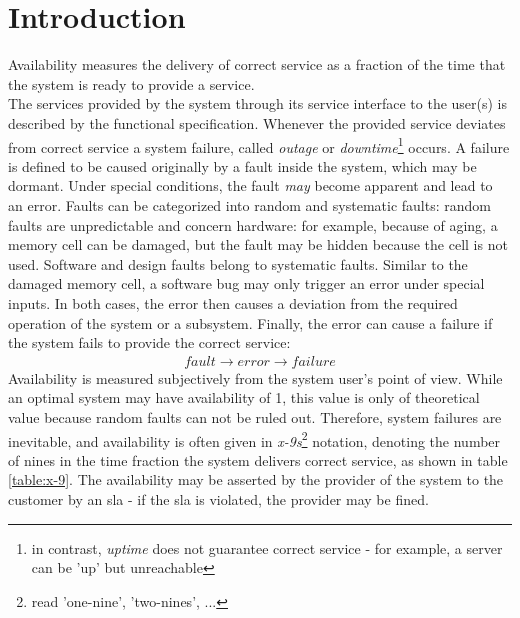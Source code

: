 \section{Introduction}\label{sec:availability}

Availability measures the delivery of correct service as a fraction of the time that the system is ready to provide a service. 
\\
The services provided by the system through its service interface to the user(s) 
is described by the functional specification. Whenever the provided service
deviates from correct service a system failure, called \textit{outage} or \textit{downtime}\footnote{in contrast, \textit{uptime} does not guarantee correct
service - for example, a server can be 'up' but unreachable} occurs. A failure is defined to be caused originally by a fault inside the system, which may be 
dormant. Under special conditions, the fault \textit{may} become apparent and lead to an error. Faults can be categorized into random and systematic faults:
random faults are unpredictable and concern hardware: for example, because of aging, a memory cell can be damaged, but the fault may be hidden because the cell
is not used. Software and design faults belong to systematic faults. Similar to the damaged memory cell, a software bug may only 
trigger an error under special inputs. In both cases, the error then causes a deviation from the required operation of the system or a subsystem. Finally, the 
error can cause a failure if the system fails to provide the correct service:
\begin{align*}
 fault \rightarrow error \rightarrow failure
\end{align*}
Availability is measured subjectively from the system user's point of view.
While an optimal system may have availability of 1, this value is only of theoretical value because random faults can not be ruled out. Therefore,
system failures are inevitable, and availability is often given in \textit{x-9s}\footnote{read 'one-nine', 'two-nines', ...} notation, denoting the 
number of nines in the time fraction the system delivers correct service, as shown in table \ref{table:x-9}.
The availability may be asserted by the provider of the system to the customer by an
\gls{sla} - if the \gls{sla} is violated, the provider may be fined.
